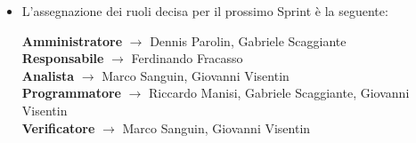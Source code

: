 \documentclass[a4paper,12pt]{article}
\begin{document}
\begin{itemize}
\begin{itemize}
    \end{itemize}
    \item L'assegnazione dei ruoli decisa per il prossimo Sprint è la seguente:
    \begin{center}
        \textbf{Amministratore} $\rightarrow$ Dennis Parolin, Gabriele Scaggiante\\
        \textbf{Responsabile} $\rightarrow$ Ferdinando Fracasso\\
        \textbf{Analista} $\rightarrow$ Marco Sanguin, Giovanni Visentin\\
        \textbf{Programmatore} $\rightarrow$ Riccardo Manisi, Gabriele Scaggiante, Giovanni Visentin\\
        \textbf{Verificatore} $\rightarrow$ Marco Sanguin, Giovanni Visentin
    \end{center}
\end{itemize}
\pagebreak
\end{document}
